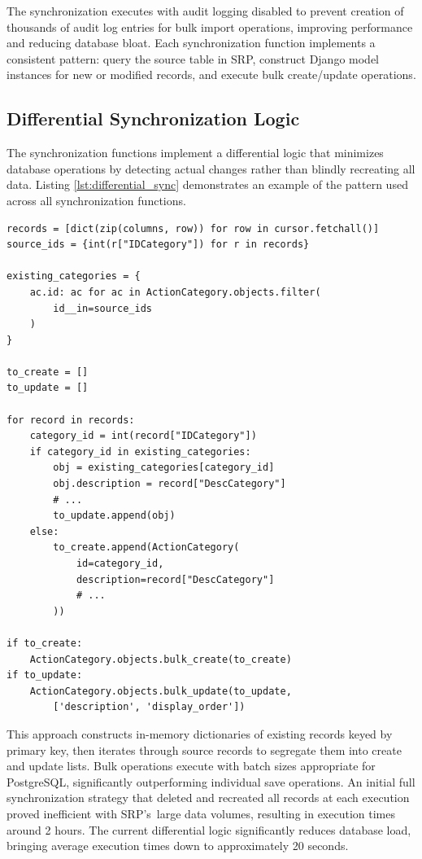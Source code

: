 The synchronization executes with audit logging disabled to prevent creation of thousands of audit log entries for bulk import operations, improving performance and reducing database bloat. Each synchronization function implements a consistent pattern: query the source table in SRP, construct Django model instances for new or modified records, and execute bulk create/update operations.

\subsection{Differential Synchronization Logic}

The synchronization functions implement a differential logic that minimizes database operations by detecting actual changes rather than blindly recreating all data. Listing \ref{lst:differential_sync} demonstrates an example of the pattern used across all synchronization functions.

\begin{listing}[htbp]
\begin{verbatim}
records = [dict(zip(columns, row)) for row in cursor.fetchall()]
source_ids = {int(r["IDCategory"]) for r in records}

existing_categories = {
    ac.id: ac for ac in ActionCategory.objects.filter(
        id__in=source_ids
    )
}

to_create = []
to_update = []

for record in records:
    category_id = int(record["IDCategory"])
    if category_id in existing_categories:
        obj = existing_categories[category_id]
        obj.description = record["DescCategory"]
        # ...
        to_update.append(obj)
    else:
        to_create.append(ActionCategory(
            id=category_id,
            description=record["DescCategory"]
            # ...
        ))

if to_create:
    ActionCategory.objects.bulk_create(to_create)
if to_update:
    ActionCategory.objects.bulk_update(to_update, 
        ['description', 'display_order'])
\end{verbatim}
\caption{Differential Synchronization Pattern with Bulk Operations}
\label{lst:differential_sync}
\end{listing}

This approach constructs in-memory dictionaries of existing records keyed by primary key, then iterates through source records to segregate them into create and update lists. Bulk operations execute with batch sizes appropriate for PostgreSQL, significantly outperforming individual save operations. An initial full synchronization strategy that deleted and recreated all records at each execution proved inefficient with SRP's~large data volumes, resulting in execution times around 2 hours. The current differential logic significantly reduces database load, bringing average execution times down to approximately 20 seconds.

